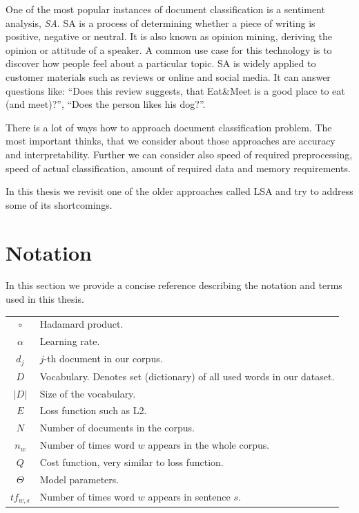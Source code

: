     One of the most popular instances of document classification is a sentiment analysis, \emph{SA}.
    SA is a process of determining whether a piece of writing is positive, negative or neutral.
    It is also known as opinion mining, deriving the opinion or attitude of a speaker. 
    A common use case for this technology is to discover how people feel about a particular topic.
    SA is widely applied to customer materials such as reviews or online and social media.
    It can answer questions like: ``Does this review suggests, that Eat\&Meet is a good place to eat (and meet)?'', ``Does the person likes his dog?''.
    
    There is a lot of ways how to approach document classification problem. 
    The most important thinks, that we consider about those approaches are accuracy and interpretability.
    Further we can consider also speed of required preprocessing, speed of actual classification, amount of required data and memory requirements. 
    
    In this thesis we revisit one of the older approaches called LSA and try to address some of its shortcomings.
    
    \* %

\section{Notation}

    In this section we provide a concise reference describing the notation and terms used in this thesis.
    
    \begin{table}[h]
        \centering
        \begin{tabular}{c l}
            $\circ$ & Hadamard product. \\
            $\alpha$ & Learning rate. \\
            $d_j$ & $j$-th document in our corpus.\\
            $D$ & Vocabulary. Denotes set (dictionary) of all used words in our dataset. \\
            $|D|$ & Size of the vocabulary. \\
            $E$ & Loss function such as L2.\\
            $N$ & Number of documents in the corpus. \\
            $n_w$ & Number of times word $w$ appears in the whole corpus. \\
            $Q$ & Cost function, very similar to loss function.\\
            $\Theta$ & Model parameters.\\
            $tf_{w,s}$ & Number of times word $w$ appears in sentence $s$. \\
            
        \end{tabular}
    \end{table}
    

